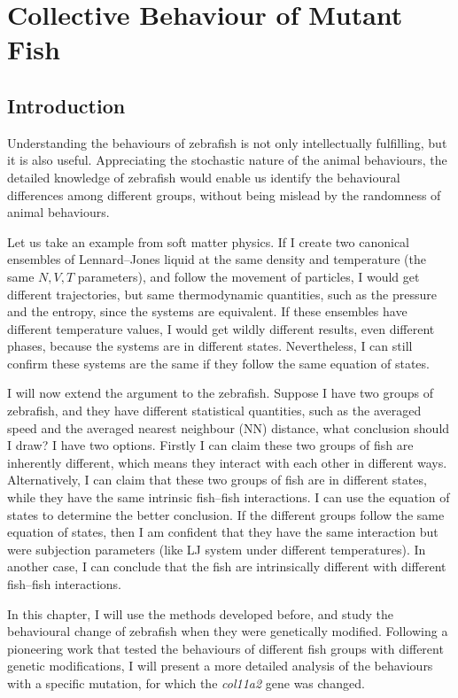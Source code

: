 \documentclass[11pt,twoside]{report}
\begin{document}
\chapter{Collective Behaviour of Mutant Fish}
\label{chapter:fish_mutation}

\section{Introduction}

Understanding the behaviours of zebrafish is not only intellectually fulfilling, but it is also useful. Appreciating the stochastic nature of the animal behaviours, the detailed knowledge of zebrafish would enable us identify the behavioural differences among different groups, without being mislead by the randomness of animal behaviours.

Let us take an example from soft matter physics. If I create two canonical ensembles of Lennard--Jones liquid at the same density and temperature (the same $N, V, T$ parameters), and follow the movement of particles, I would get different trajectories, but same thermodynamic quantities, such as the pressure and the entropy, since the systems are equivalent. If these ensembles have different temperature values, I would get wildly different results, even different phases, because the systems are in different states. Nevertheless, I can still confirm these systems are the same if they follow the same equation of states.

I will now extend the argument to the zebrafish. Suppose I have two groups of zebrafish, and they have different statistical quantities, such as the averaged speed and the averaged nearest neighbour (NN) distance, what conclusion should I draw? I have two options. Firstly I can claim these two groups of fish are inherently different, which means they interact with each other in different ways. Alternatively, I can claim that these two groups of fish are in different states, while they have the same intrinsic fish--fish interactions. I can use the equation of states to determine the better conclusion. If the different groups follow the same equation of states, then I am confident that they have the same interaction but were subjection parameters (like LJ system under different temperatures). In another case, I can conclude that the fish are intrinsically different with different fish--fish interactions.

In this chapter, I will use the methods developed before, and study the behavioural change of zebrafish when they were genetically modified. Following a pioneering work \cite{tang2020} that tested the behaviours of different fish groups with different genetic modifications, I will present a more detailed analysis of the behaviours with a specific mutation, for which the \emph{col11a2} gene was changed.
\end{document}
